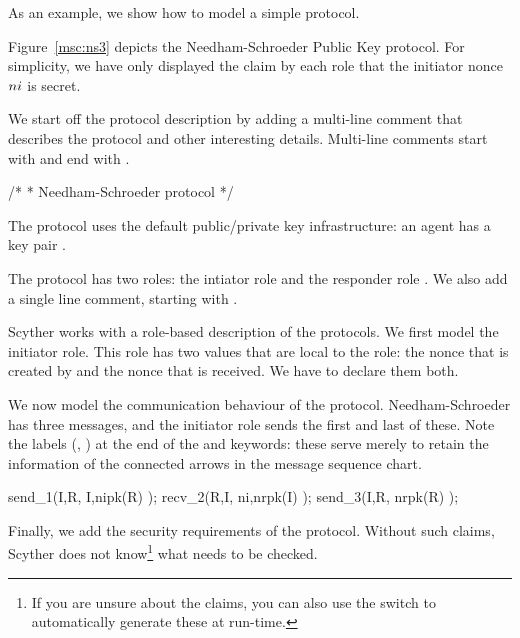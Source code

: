 \documentclass{book}
\begin{document}
As an example, we show how to model a simple protocol.

Figure~\ref{msc:ns3} depicts the Needham-Schroeder Public Key protocol.
For simplicity, we have only displayed the claim by each role
that the initiator nonce $ni$ is secret.

We start off the protocol description by adding a multi-line
comment that describes the protocol and other interesting details.
Multi-line comments start with \spd{/*} and end with \spd{*/}.
\begin{spdl}[numbers=left]
/* 
 * Needham-Schroeder protocol
 */
\end{spdl}

The protocol uses the default public/private key infrastructure: an agent
 has
a key pair . 

The protocol has two roles: the
intiator role  and the responder role . We also add a
single line comment, starting with \spd{//}.
\begin{spdl}[numbers=left,firstnumber=5]
// The protocol description

protocol ns3(I,R)
{
\end{spdl}

Scyther works with a role-based description of the protocols. We first
model the initiator role. This role has two values that are local to the
role: the nonce that is created by  and the nonce that is
received. We have to declare them both.
\begin{spdl}[numbers=left,firstnumber=9]
  role I
  {
    fresh ni: Nonce;
    var nr: Nonce;
\end{spdl}

We now model the communication behaviour of the protocol.
Needham-Schroeder has three messages, and the initiator role sends the
first and last of these. Note the labels (\eg, ) at the end of
the  and  keywords: these serve merely to retain the
information of the connected arrows in the message sequence chart.

\begin{spdl}[numbers=left,firstnumber=14]
    send_1(I,R, {I,ni}pk(R) );
    recv_2(R,I, {ni,nr}pk(I) );
    send_3(I,R, {nr}pk(R) );
\end{spdl}


Finally, we add the security requirements of the protocol. Without such
claims, Scyther does not know\footnote{If you are unsure about the
claims, you can also use the  switch to automatically
generate these at run-time.} what needs to be checked.
\end{document}
